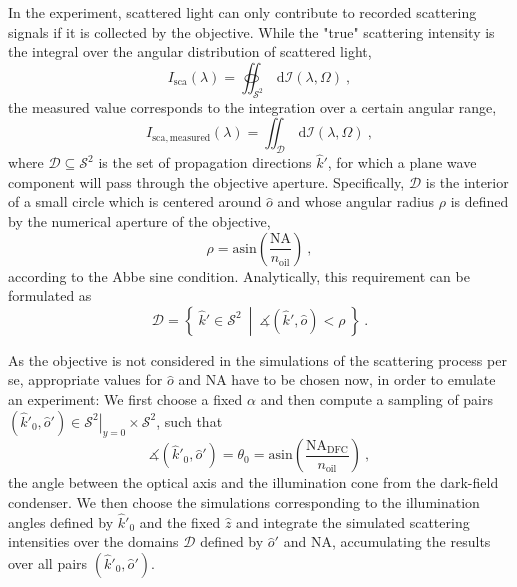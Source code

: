 \documentclass[10pt]{article}
\begin{document}
In the experiment, scattered light can only contribute to recorded scattering signals if it is collected by the objective. 
While the "true" scattering intensity is the integral over the angular distribution of scattered light, 
$$
    I_\mathrm{sca}(\lambda) = \oiint_{\mathcal{S}^2} \,\mathrm{d}\mathcal{I}(\lambda, \Omega) \ , %
$$
the measured value corresponds to the integration over a certain angular range, %
$$
    I_\mathrm{sca,measured}(\lambda) = \iint_{\mathcal{D}} \,\mathrm{d}\mathcal{I}(\lambda, \Omega) \ , 
$$
where $\mathcal{D} \subseteq \mathcal{S}^2$ is the set of propagation directions $\hat{k}'$, for which a plane wave component will pass through the objective aperture. %
Specifically, $\mathcal{D}$ is the interior of a small circle which is centered around $\hat{o}$ and whose angular radius $\rho$ is defined by the numerical aperture of the objective, 
$$
    \rho = \mathrm{asin}\!\left( \frac{\mathrm{NA}}{n_\mathrm{oil}} \right) \ ,
$$
according to the Abbe sine condition. \cite{MONA-BFP-photonic-crystals,MONA-BFP-photonic-stop-bands} 
Analytically, this requirement can be formulated as 
$$
    \mathcal{D} = \left\lbrace\ \hat{k}' \in \mathcal{S}^2\ \middle\vert\ \measuredangle\!\left( \hat{k}', \hat{o}\right) < \rho\ \right\rbrace
    \ .
$$


As the objective is not considered in the simulations of the scattering process per se, appropriate values for $\hat{o}$ and $\mathrm{NA}$ have to be chosen now, in order to emulate an experiment: 
We first choose a fixed $\alpha$ and then compute a sampling of pairs $\left( \hat{k}'_0 , \hat{o}' \right) \in \left. \mathcal{S}^2 \right\vert_{y=0} \times \mathcal{S}^2$, such that 
$$
    \measuredangle\!\left(\hat{k}'_0 , \hat{o}'\right) = \theta_0 = \mathrm{asin}\!\left( \frac{\mathrm{NA}_\mathrm{DFC}}{n_\mathrm{oil}} \right) \ , 
$$
the angle between the optical axis and the illumination cone from the dark-field condenser. 
We then choose the simulations corresponding to the illumination angles defined by $\hat{k}'_0$ and the fixed $\hat{z}$ and integrate the simulated scattering intensities over the domains $\mathcal{D}$ defined by $\hat{o}'$ and $\mathrm{NA}$, accumulating the results over all pairs $\left( \hat{k}'_0 , \hat{o}' \right)$.
\end{document}
